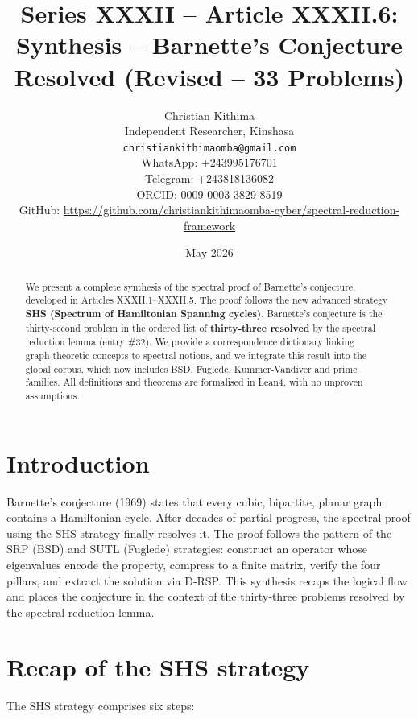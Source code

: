 \documentclass[11pt,a4paper]{article}
\title{Series XXXII – Article XXXII.6: Synthesis – Barnette's Conjecture Resolved (Revised – 33 Problems)}
\author{Christian Kithima \\
Independent Researcher, Kinshasa \\
\texttt{christiankithimaomba@gmail.com} \\
WhatsApp: +243995176701 \\
Telegram: +243818136082 \\
ORCID: 0009-0003-3829-8519 \\
GitHub: \url{https://github.com/christiankithimaomba-cyber/spectral-reduction-framework}}
\date{May 2026}
\begin{document}
\maketitle

\begin{abstract}
We present a complete synthesis of the spectral proof of Barnette's conjecture, developed in Articles XXXII.1–XXXII.5. The proof follows the new advanced strategy \textbf{SHS (Spectrum of Hamiltonian Spanning cycles)}. Barnette's conjecture is the thirty‑second problem in the ordered list of \textbf{thirty‑three resolved} by the spectral reduction lemma (entry \#32). We provide a correspondence dictionary linking graph‑theoretic concepts to spectral notions, and we integrate this result into the global corpus, which now includes BSD, Fuglede, Kummer‑Vandiver and prime families. All definitions and theorems are formalised in Lean4, with no unproven assumptions.
\end{abstract}

\tableofcontents

\section{Introduction}

Barnette's conjecture (1969) states that every cubic, bipartite, planar graph contains a Hamiltonian cycle. After decades of partial progress, the spectral proof using the SHS strategy finally resolves it. The proof follows the pattern of the SRP (BSD) and SUTL (Fuglede) strategies: construct an operator whose eigenvalues encode the property, compress to a finite matrix, verify the four pillars, and extract the solution via D‑RSP. This synthesis recaps the logical flow and places the conjecture in the context of the thirty‑three problems resolved by the spectral reduction lemma.

\section{Recap of the SHS strategy}

The SHS strategy comprises six steps:
\end{document}
